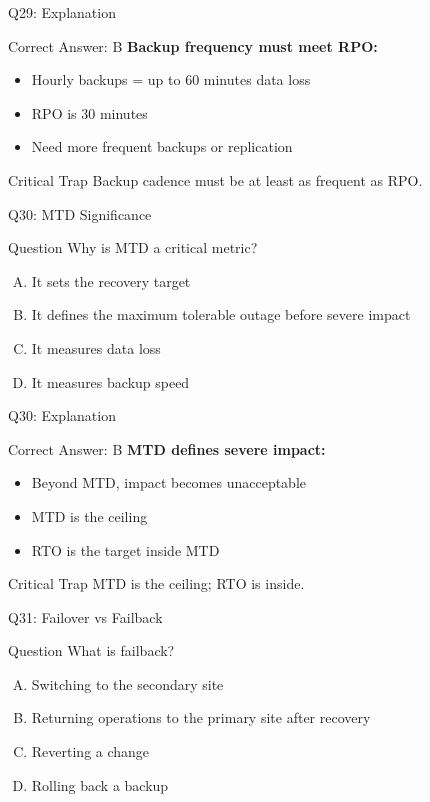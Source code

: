 \documentclass{beamer}
\begin{document}
	\begin{frame}{Q29: Explanation}
		\begin{block}{Correct Answer: B}
			\textbf{Backup frequency must meet RPO:}
			\begin{itemize}
				\item Hourly backups = up to 60 minutes data loss
				\item RPO is 30 minutes
				\item Need more frequent backups or replication
			\end{itemize}
		\end{block}
		\begin{alertblock}{Critical Trap}
			Backup cadence must be at least as frequent as RPO.
		\end{alertblock}
	\end{frame}
	
	\begin{frame}{Q30: MTD Significance}
		\begin{block}{Question}
			Why is MTD a critical metric?
		\end{block}
		\begin{enumerate}[(A)]
			\item It sets the recovery target
			\item It defines the maximum tolerable outage before severe impact
			\item It measures data loss
			\item It measures backup speed
		\end{enumerate}
	\end{frame}
	
	\begin{frame}{Q30: Explanation}
		\begin{block}{Correct Answer: B}
			\textbf{MTD defines severe impact:}
			\begin{itemize}
				\item Beyond MTD, impact becomes unacceptable
				\item MTD is the ceiling
				\item RTO is the target inside MTD
			\end{itemize}
		\end{block}
		\begin{alertblock}{Critical Trap}
			MTD is the ceiling; RTO is inside.
		\end{alertblock}
	\end{frame}
	
	\begin{frame}{Q31: Failover vs Failback}
		\begin{block}{Question}
			What is failback?
		\end{block}
		\begin{enumerate}[(A)]
			\item Switching to the secondary site
			\item Returning operations to the primary site after recovery
			\item Reverting a change
			\item Rolling back a backup
		\end{enumerate}
	\end{frame}
	
\end{document}
